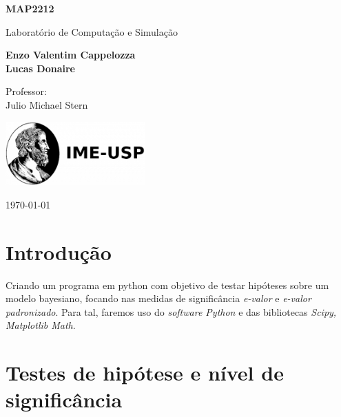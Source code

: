 \documentclass[11pt, a4paper]{article}
\begin{document}
\begin{titlepage}
    \begin{center}
        \vspace*{3cm}
            
        \Huge
        \textbf{MAP2212}
            
        \vspace{1cm}
        \huge
        Laboratório de Computação e Simulação \\
            
        \vspace{1.5cm}
        \Large
            
        \textbf{Enzo Valentim Cappelozza}     \\
        \textbf{Lucas Donaire}%
        
            
        \vfill
        
        Professor:  \\
        Julio Michael Stern
            
        \vspace{1cm}
            
        \includegraphics[width=0.4\textwidth]{2_49.png}
        \\
        
        \Large
        
        \today
            
    \end{center}
\end{titlepage}


\newpage
\section{Introdução}
Criando um programa em python com objetivo de testar hipóteses sobre um modelo bayesiano, focando nas medidas de significância \textit{e-valor} e \textit{e-valor padronizado}. Para tal, faremos uso do \textit{software Python} e das bibliotecas \textit{Scipy, Matplotlib  Math}.

\section{Testes de hipótese e nível de significância}
\end{document}
